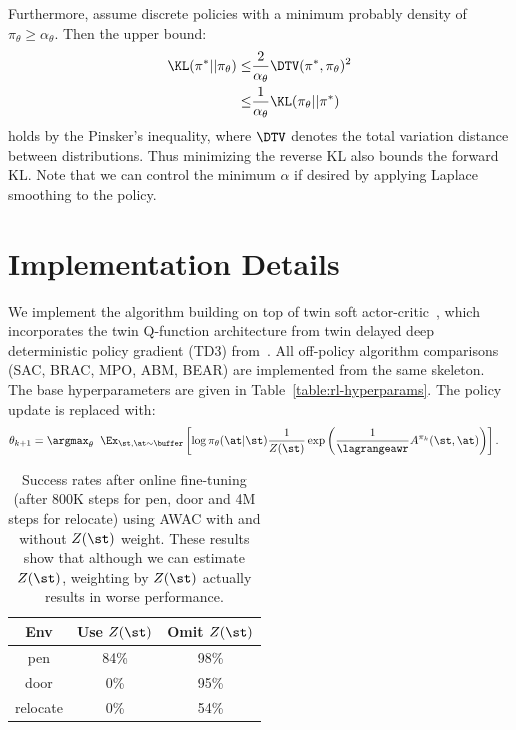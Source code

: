 Furthermore, assume discrete policies with a minimum probably density of $\pi_\theta \geq \alpha_\theta$. Then the upper bound:
\begin{align}
    \KL(\pi^*||\pi_\theta) \leq & \frac{2}{\alpha_\theta} \DTV(\pi^*, \pi_\theta)^2 \\
    \leq & \frac{1}{\alpha_\theta} \KL(\pi_\theta||\pi^*)
\end{align}
holds by the Pinsker's inequality, where $\DTV$ denotes the total variation distance between distributions. Thus minimizing the reverse KL also bounds the forward KL. Note that we can control the minimum $\alpha$ if desired by applying Laplace smoothing to the policy.

\section{Implementation Details} \label{sec:implementation}

We implement the algorithm building on top of twin soft actor-critic~\citep{haarnoja2018sac}, which incorporates the twin Q-function architecture from twin delayed deep deterministic policy gradient (TD3) from~\citet{fujimoto2018td3}. All off-policy algorithm comparisons (SAC, BRAC, MPO, ABM, BEAR) are implemented from the same skeleton. The base hyperparameters are given in Table~\ref{table:rl-hyperparams}. The policy update is replaced with:
\begin{align}
    \theta_{k+1} = \argmax_\theta \; & \; \Ex_{\st, \at \sim \buffer}
    \left[\log \pi_\theta(\at|\st) \frac{1}{Z(\st)}  \exp \left(\frac{1}{\lagrangeawr}A^{\pi_k}(\st, \at) \right)\right].
\end{align}

\begin{table}[h!]
\footnotesize
\begin{tabular}{c|c|c}
Env      & \shortstack{Use \\ $Z(\st)$} & \shortstack{Omit \\ $Z(\st)$} \\ \hline
pen      & 84\%      & 98\%    \\
door     & 0\%      & 95\%    \\
relocate & 0\%      & 54\%
\end{tabular}
\caption{Success rates after online fine-tuning (after 800K steps for pen, door and 4M steps for relocate) using AWAC with and without $Z(\st)$ weight. These results show that although we can estimate $Z(\st)$, weighting by $Z(\st)$ actually results in worse performance.}
\label{fig:z}
\end{table}

